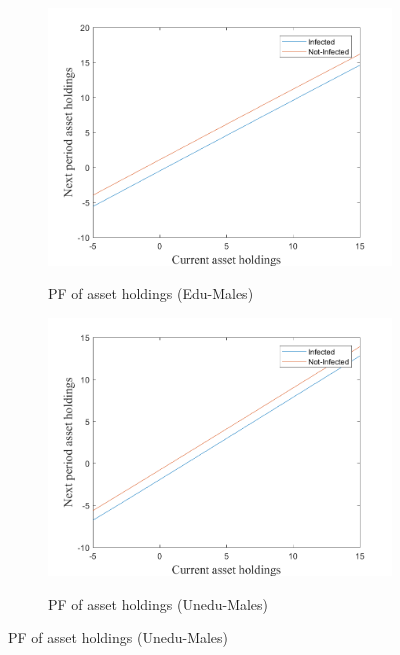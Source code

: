 \begin{figure}\caption{Miopic onset of the epidemic, Stage 2:}
\begin{subfigure}{0.5\textwidth}\caption{PF of asset holdings (Edu-Males)}
   \includegraphics[width=\linewidth,height = 0.225\textheight]{figures/mio/FIG1.png}
    \label{fig_dert}
\end{subfigure}
\hspace*{\fill}
\begin{subfigure}{0.5\textwidth}\caption{PF of asset holdings (Unedu-Males)}
   \includegraphics[width=\linewidth,height = 0.225\textheight]{figures/mio/FIG2.png}
    \label{fig:x_b}
\end{subfigure}

\end{figure}
